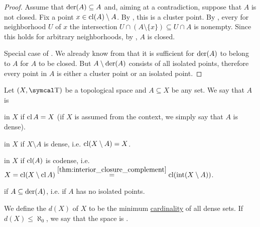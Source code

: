 \begin{proof}
   Assume that \( \operatorname{der}(A) \subseteq A \) and, aiming at a contradiction, suppose that \( A \) is not closed. Fix a point \( x \in \operatorname{cl}(A) \setminus A \). By , this is a cluster point. By , every for neighborhood \( U \) of \( x \) the intersection \( U \cap (A \setminus \{ x \}) \subseteq U \cap A \) is nonempty. Since this holds for arbitrary neighborhoods, by , \( A \) is closed.

  Special case of .
   We already know from  that it is sufficient for \( \operatorname{der}(A) \) to belong to \( A \) for \( A \) to be closed. But \( A \setminus \operatorname{der}(A) \) consists of all isolated points, therefore every point in \( A \) is either a cluster point or an isolated point.
\end{proof}

\begin{definition}\label{def:topologically_dense_set}
  Let \( (X, \CT) \) be a topological space and \( A \subseteq X \) be any set. We say that \( A \) is

  \begin{DefEnum}
      in \( X \) if \( \operatorname{cl}{A} = X \) (if \( X \) is assumed from the context, we simply say that \( A \) is dense).

      in \( X \) if \( X \setminus A \) is dense, i.e. \( \operatorname{cl}(X \setminus A) = X \).

      in \( X \) if \( \operatorname{cl}(A) \) is codense, i.e. \( X = \operatorname{cl}(X \setminus \operatorname{cl} A) \overset {\ref{thm:interior_closure_complement}} = \operatorname{cl}(\operatorname{int}(X \setminus A)) \).

      if \( A \subseteq \operatorname{der}(A) \), i.e. if \( A \) has no isolated points.
  \end{DefEnum}

  We define the  \( d(X) \) of \( X \) to be the minimum \hyperref[def:cardinal]{cardinality} of all dense sets. If \( d(X) \leq \aleph_0 \), we say that the space is .
\end{definition}

